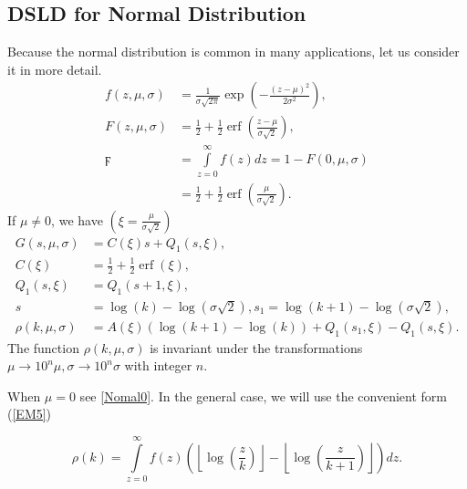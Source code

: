 \documentclass[titlepage,fleqn]{article}%
\begin{document}
\subsection{DSLD for Normal Distribution}%

\label{NormD}%
Because the normal distribution is common in many applications, let us
consider it in more detail.
\begin{align*}
f(z,\mu,\sigma)  &  =\frac{1}{\sigma\sqrt{2\pi}}\exp\left(  -\frac{(z-\mu
)^{2}}{2\sigma^{2}}\right)  ,\\
F(z,\mu,\sigma)  &  =\frac{1}{2}+\frac{1}{2}\operatorname{erf}\left(
\frac{z-\mu}{\sigma\sqrt{2}}\right)  ,\\
\digamma &  =%
{\displaystyle\int\limits_{z=0}^{\infty}}
f(z)dz=1-F(0,\mu,\sigma)\\
&  =\frac{1}{2}+\frac{1}{2}\operatorname{erf}\left(  \frac{\mu}{\sigma\sqrt
{2}}\right)  .
\end{align*}
If $\mu\neq0$, we have $\left(  \xi=\frac{\mu}{\sigma\sqrt{2}}\right)  $
\begin{align*}
G(s,\mu,\sigma)  &  =C\left(  \xi\right)  s+Q_{1}\left(  s,\xi\right)  ,\\
C\left(  \xi\right)   &  =\frac{1}{2}+\frac{1}{2}\operatorname{erf}\left(
\xi\right)  ,\\
Q_{1}\left(  s,\xi\right)   &  =Q_{1}\left(  s+1,\xi\right)  ,\\
s  &  =\log(k)-\log(\sigma\sqrt{2}),s_{1}=\log(k+1)-\log(\sigma\sqrt{2}),\\
\rho(k,\mu,\sigma)  &  =A\left(  \xi\right)  \left(  \log(k+1)-\log(k)\right)
+Q_{1}\left(  s_{1},\xi\right)  -Q_{1}\left(  s,\xi\right)  .
\end{align*}
The function $\rho(k,\mu,\sigma)$ is invariant under the transformations
$\mu\rightarrow10^{n}\mu,\sigma\rightarrow10^{n}\sigma$ with integer $n$.

When $\mu=0$ see \ref{Nomal0}. In the general case, we will use the convenient
form (\ref{EM5})%

\begin{equation}
\rho(k)=%
{\displaystyle\int\limits_{z=0}^{\infty}}
f(z)\left(  \left\lfloor \log\left(  \frac{z}{k}\right)  \right\rfloor
-\left\lfloor \log\left(  \frac{z}{k+1}\right)  \right\rfloor \right)  dz.
\label{Nomal1}%
\end{equation}
\end{document}
